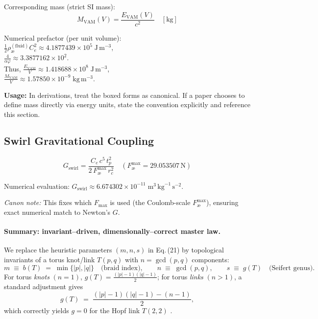 \documentclass[11pt, a4paper]{article}
\begin{document}
Corresponding mass (strict SI mass):
\begin{equation}
M_{\text{VAM}}(V) = \frac{E_{\text{VAM}}(V)}{c^{2}}
\quad [\text{kg}]
\end{equation}

Numerical prefactor (per unit volume):\\
$\frac{1}{2}\rho_{\text{\ae}}^{(\text{fluid})}C_e^2 \approx 4.1877439\times10^{5}\;\text{J}\,\text{m}^{-3}$,\\
$\frac{4}{\alpha\varphi} \approx 3.3877162\times10^{2}$.\\
Thus, $\frac{E_{\text{VAM}}}{V} \approx 1.418688\times10^{8}\;\text{J}\,\text{m}^{-3}$,\\
$\frac{M_{\text{VAM}}}{V} \approx 1.57850\times10^{-9}\;\text{kg}\,\text{m}^{-3}$.

\textbf{Usage:} In derivations, treat the boxed forms as canonical. If a paper chooses to define mass directly via energy units, state the convention explicitly and reference this section.

\subsection{Swirl Gravitational Coupling}

\begin{equation}
G_{\text{swirl}} = \frac{C_e\,c^{5}\,t_p^{2}}{2\,F_{\text{\ae}}^{\max}\,r_c^{2}}
\quad \left( F_{\text{\ae}}^{\max}=29.053507\,\text{N} \right)
\end{equation}

Numerical evaluation: $G_{\text{swirl}} \approx 6.674302\times10^{-11}\;\text{m}^3\,\text{kg}^{-1}\,\text{s}^{-2}$.

\textit{Canon note:} This fixes which $F_{\max}$ is used (the Coulomb-scale $F_{\text{\ae}}^{\max}$), ensuring exact numerical match to Newton’s $G$.

\paragraph{Summary: invariant--driven, dimensionally–correct master law.}
We replace the heuristic parameters \((m,n,s)\) in Eq.\,(21) by topological invariants of a torus knot/link \(T(p,q)\) with \(n=\gcd(p,q)\) components:
\[
    m \;\equiv\; b(T) \;=\; \min\{|p|,|q|\}\quad\text{(braid index)},\qquad
    n \;\equiv\; \gcd(p,q),\qquad
    s \;\equiv\; g(T)\quad\text{(Seifert genus)}.
\]
For torus \emph{knots} \((n=1)\), \(g(T)=\frac{(|p|-1)(|q|-1)}{2}\); for torus \emph{links} \((n>1)\), a standard adjustment gives
\[
    g(T)\;=\;\frac{(|p|-1)(|q|-1)-(n-1)}{2},
\]
which correctly yields \(g=0\) for the Hopf link \(T(2,2)\) \cite{Rolfsen1976Knots,Lickorish1997Knots,Murasugi1996KnotTheory}.
\end{document}
